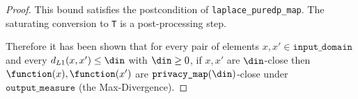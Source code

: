 \documentclass{article}
\begin{document}
\begin{proof}
This bound satisfies the postcondition of \texttt{laplace\_puredp\_map}.
The saturating conversion to \texttt{T} is a post-processing step.

Therefore it has been shown that for every pair of elements $x, x' \in \texttt{input\_domain}$ and every $d_{L1}(x, x') \le \din$ with $\din \ge 0$, 
if $x, x'$ are $\din$-close then $\function(x),\function(x')$ are $\texttt{privacy\_map}(\din)$-close under $\texttt{output\_measure}$ (the Max-Divergence).
\end{proof}
\end{document}
